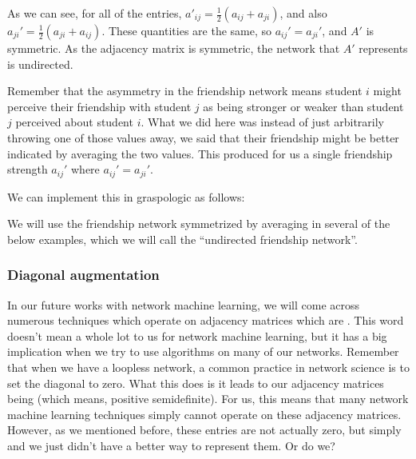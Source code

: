 \documentclass[letterpaper,10pt,english]{jupyterBook}
\begin{document}
\sphinxAtStartPar
As we can see, for all of the entries, \(a'_{ij} = \frac{1}{2} (a_{ij} + a_{ji})\), and also \(a_{ji}' = \frac{1}{2}(a_{ji} + a_{ij})\). These quantities are the same, so \(a_{ij}' = a_{ji}'\), and \(A'\) is symmetric. As the adjacency matrix is symmetric, the network that \(A'\) represents is undirected.

\sphinxAtStartPar
Remember that the asymmetry in the friendship network means student \(i\) might perceive their friendship with student \(j\) as being stronger or weaker than student \(j\) perceived about student \(i\). What we did here was instead of just arbitrarily throwing one of those values away, we said that their friendship might be better indicated by averaging the two values. This produced for us a single friendship strength \(a_{ij}'\) where \(a_{ij}' = a_{ji}'\).

\sphinxAtStartPar
We can implement this in graspologic as follows:

\begin{sphinxVerbatim}[commandchars=\\\{\}]
   
\end{sphinxVerbatim}

\noindent{}

\sphinxAtStartPar
We will use the friendship network symmetrized by averaging in several of the below examples, which we will call the “undirected friendship network”.


\subsubsection{Diagonal augmentation}
\label{\detokenize{representations/ch4/regularization:diagonal-augmentation}}
\sphinxAtStartPar
In our future works with network machine learning, we will come across numerous techniques which operate on adjacency matrices which are . This word doesn’t mean a whole lot to us for network machine learning, but it has a big implication when we try to use algorithms on many of our networks. Remember that when we have a loopless network, a common practice in network science is to set the diagonal to zero. What this does is it leads to our adjacency matrices being  (which means,  positive semi\sphinxhyphen{}definite). For us, this means that many network machine learning techniques simply cannot operate on these adjacency matrices. However, as we mentioned before, these entries are not actually zero, but simply  and we just didn’t have a better way to represent them. Or do we?
\end{document}
